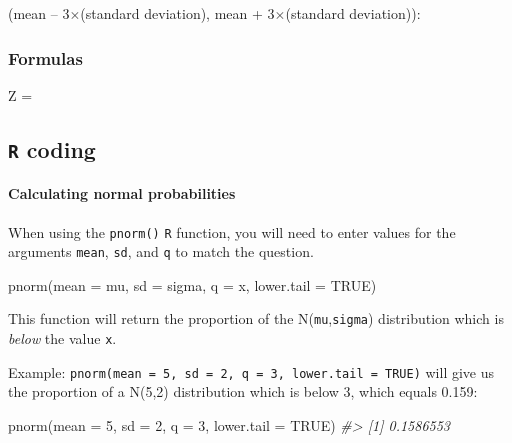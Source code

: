 \documentclass[
]{report}
\newenvironment{Shaded}{\begin{snugshade}}{\end{snugshade}}
\newcommand{\AttributeTok}[1]{\textcolor[rgb]{0.77,0.63,0.00}{#1}}
\newcommand{\CommentTok}[1]{\textcolor[rgb]{0.56,0.35,0.01}{\textit{#1}}}
\newcommand{\ConstantTok}[1]{\textcolor[rgb]{0.00,0.00,0.00}{#1}}
\newcommand{\DecValTok}[1]{\textcolor[rgb]{0.00,0.00,0.81}{#1}}
\newcommand{\FunctionTok}[1]{\textcolor[rgb]{0.00,0.00,0.00}{#1}}
\newcommand{\NormalTok}[1]{#1}
\newcommand{\rgs}{\vspace{12pt}} %
\newcommand{\rgi}{\hspace{24pt}}  %
\begin{document}
\rgi (mean -- 3\(\times\)(standard deviation), mean + 3\(\times\)(standard deviation)):
\rgs

\hypertarget{formulas-1}{%
\subsubsection*{Formulas}\label{formulas-1}}

Z =
\rgs

\hypertarget{r-coding}{%
\subsection*{\texorpdfstring{\texttt{R} coding}{R coding}}\label{r-coding}}

\hypertarget{calculating-normal-probabilities}{%
\paragraph*{Calculating normal probabilities}\label{calculating-normal-probabilities}}

When using the \texttt{pnorm()} \texttt{R} function, you will need to enter values for the arguments \texttt{mean}, \texttt{sd}, and \texttt{q} to match the question.

\begin{Shaded}
\begin{Highlighting}[]
\FunctionTok{pnorm}\NormalTok{(}\AttributeTok{mean =}\NormalTok{ mu, }\AttributeTok{sd =}\NormalTok{ sigma, }\AttributeTok{q =}\NormalTok{ x, }\AttributeTok{lower.tail =} \ConstantTok{TRUE}\NormalTok{)}
\end{Highlighting}
\end{Shaded}

This function will return the proportion of the N(\texttt{mu},\texttt{sigma}) distribution which is \emph{below} the value \texttt{x}.

Example: \texttt{pnorm(mean\ =\ 5,\ sd\ =\ 2,\ q\ =\ 3,\ lower.tail\ =\ TRUE)} will give us the proportion of a N(5,2) distribution which is below 3, which equals 0.159:

\begin{Shaded}
\begin{Highlighting}[]
\FunctionTok{pnorm}\NormalTok{(}\AttributeTok{mean =} \DecValTok{5}\NormalTok{, }\AttributeTok{sd =} \DecValTok{2}\NormalTok{, }\AttributeTok{q =} \DecValTok{3}\NormalTok{, }\AttributeTok{lower.tail =} \ConstantTok{TRUE}\NormalTok{)}
\CommentTok{\#\textgreater{} [1] 0.1586553}
\end{Highlighting}
\end{Shaded}
\end{document}
